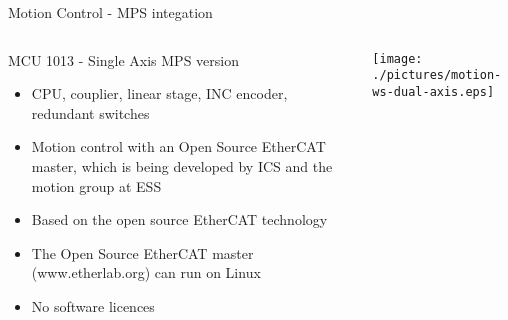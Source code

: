 \documentclass[
  9pt
  , table
  , ignorenonframetext
]{beamer}
\begin{document}
\begin{frame}{Motion Control - MPS integation}
  \begin{columns}
    \begin{column}{.6\textwidth}
      \begin{block}{MCU 1013 - Single Axis MPS version}
        \begin{itemize}
        \item CPU, couplier, linear stage, INC encoder, redundant switches
        \item Motion control with an Open Source EtherCAT master, which is being developed by ICS and the motion group at ESS
        \item Based on the open source EtherCAT technology
        \item The Open Source EtherCAT master (www.etherlab.org) can run on Linux
        \item  No software licences
        \end{itemize}
      \end{block}
    \end{column}
    \begin{column}{.5\textwidth}
      \centering
      \texttt{[image: ./pictures/motion-ws-dual-axis.eps]}
      
    \end{column}
    \end{columns}
\end{frame}
\end{document}
